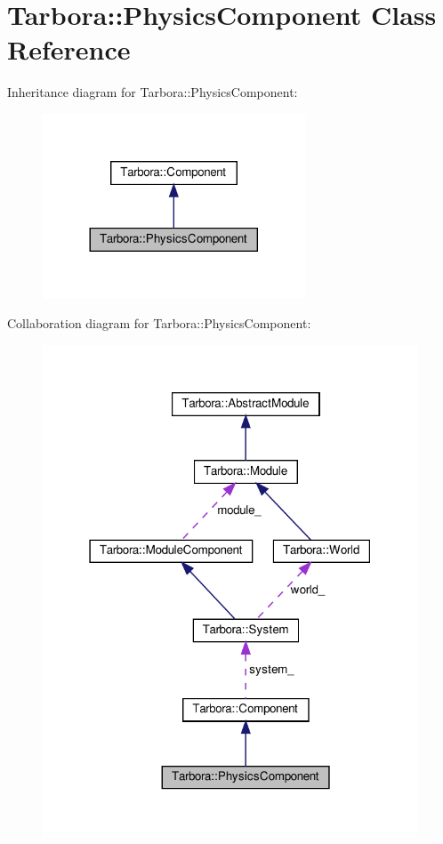 \hypertarget{classTarbora_1_1PhysicsComponent}{}\section{Tarbora\+:\+:Physics\+Component Class Reference}
\label{classTarbora_1_1PhysicsComponent}


Inheritance diagram for Tarbora\+:\+:Physics\+Component\+:
\nopagebreak
\begin{figure}[H]
\begin{center}
\leavevmode
\includegraphics[width=221pt]{classTarbora_1_1PhysicsComponent__inherit__graph}
\end{center}
\end{figure}


Collaboration diagram for Tarbora\+:\+:Physics\+Component\+:
\nopagebreak
\begin{figure}[H]
\begin{center}
\leavevmode
\includegraphics[width=316pt]{classTarbora_1_1PhysicsComponent__coll__graph}
\end{center}
\end{figure}
